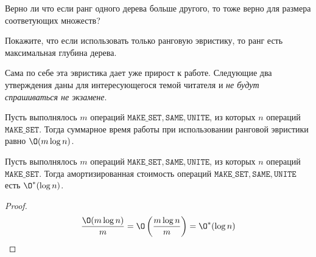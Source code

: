 \Exe Верно ли что если ранг одного дерева больше другого, то тоже верно для размера соответующих множеств?

\Exe Покажите, что если использовать только ранговую эвристику, то ранг есть максимальная глубина дерева.

Сама по себе эта эвристика дает уже прирост к работе. Следующие два утверждения даны для интересующегося темой читателя и \textit{не будут спрашиваться не экзамене}.

\ThBd Пусть выполнялось $m$ операций $\texttt{MAKE\_SET}, \texttt{SAME}, \texttt{UNITE}$, из которых $n$ операций $\texttt{MAKE\_SET}$. Тогда суммарное время работы при использовании ранговой эвристики равно $\O(m \log n)$.


    

\ConsBd Пусть выполнялось $m$ операций $\texttt{MAKE\_SET}, \texttt{SAME}, \texttt{UNITE}$, из которых $n$ операций $\texttt{MAKE\_SET}$. Тогда амортизированная стоимость операций $\texttt{MAKE\_SET}, \texttt{SAME}, \texttt{UNITE}$ есть $\O^*(\log n)$.
\begin{proof}

    \begin{equation*}
        \frac{\O(m \log n)}{m} = \O \left(\frac{m \log n}{m}\right) = \O^*(\log n)
    \end{equation*}

\end{proof}

